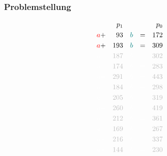\documentclass{beamer}
\begin{document}
\begin{frame}
    \frametitle{Problemstellung}
    \small
    \begin{alignat*}{5}
           && p_1 &&     && && p_0 \\
        {\color{red}a} +&&                     93 &&   {\color{teal}b}    &&               =&&                    172 \\
        {\color{red}a} +&&                    193 &&   {\color{teal}b}    &&               =&&                    309 \\
        {\color{white}a +}&& {\color{lightgray}187} &&   {\color{white}b} &&{\color{white}=}&& {\color{lightgray}302} \\
        {\color{white}a +}&& {\color{lightgray}174} &&   {\color{white}b} &&{\color{white}=}&& {\color{lightgray}283} \\
        {\color{white}a +}&& {\color{lightgray}291} &&   {\color{white}b} &&{\color{white}=}&& {\color{lightgray}443} \\
        {\color{white}a +}&& {\color{lightgray}184} &&   {\color{white}b} &&{\color{white}=}&& {\color{lightgray}298} \\
        {\color{white}a +}&& {\color{lightgray}205} &&   {\color{white}b} &&{\color{white}=}&& {\color{lightgray}319} \\
        {\color{white}a +}&& {\color{lightgray}260} &&   {\color{white}b} &&{\color{white}=}&& {\color{lightgray}419} \\
        {\color{white}a +}&& {\color{lightgray}212} &&   {\color{white}b} &&{\color{white}=}&& {\color{lightgray}361} \\
        {\color{white}a +}&& {\color{lightgray}169} &&   {\color{white}b} &&{\color{white}=}&& {\color{lightgray}267} \\
        {\color{white}a +}&& {\color{lightgray}216} &&   {\color{white}b} &&{\color{white}=}&& {\color{lightgray}337} \\
        {\color{white}a +}&& {\color{lightgray}144} &&   {\color{white}b} &&{\color{white}=}&& {\color{lightgray}230}
    \end{alignat*}
\end{frame}
\end{document}
